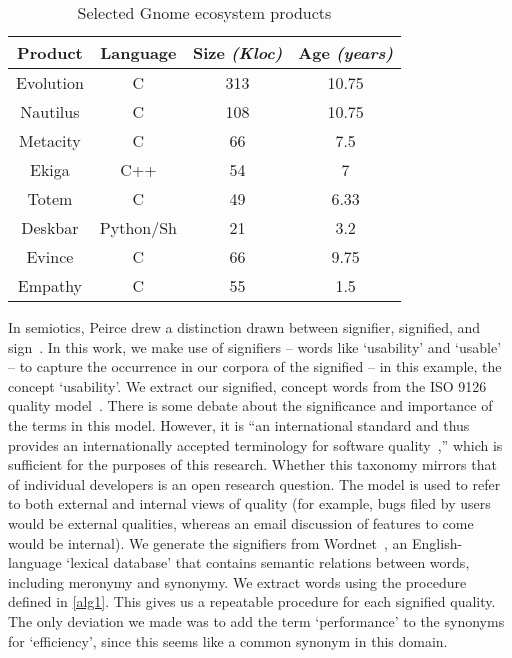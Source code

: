 \documentclass[conference, compsoc]{IEEEtran}
\begin{document}
\begin{table}
	\caption{Selected Gnome ecosystem products}
	\centering
	\label{tbl:projects}
\begin{tabular}{|c|c|c|c|}
\hline
\rowcolor[gray]{.9} 
\textbf{Product} & \textbf{Language} & \textbf{Size} \emph{(Kloc)} & \textbf{Age} \emph{(years)} \\
\hline
\hline 
Evolution & C & 313 & 10.75\\ \hline
Nautilus & C & 108 & 10.75  \\ \hline
Metacity & C & 66 & 7.5  \\ \hline
Ekiga & C++ & 54 & 7  \\ \hline
Totem & C & 49 & 6.33  \\ \hline
Deskbar & Python/Sh & 21 & 3.2  \\ \hline
Evince & C & 66 & 9.75\\ \hline
Empathy &C & 55 & 1.5\\ 
\hline
\end{tabular}
\end{table}

In semiotics, Peirce drew a distinction drawn between signifier, signified, and sign~\cite{atkin2006}. In this work, we make use of signifiers -- words like `usability' and `usable' -- to capture the occurrence in our corpora of the signified -- in this example, the concept `usability'. We extract our signified, concept words from the ISO 9126 quality model~\cite{iso9126}. There is some debate about the significance and importance of the terms in this model. However, it is ``an international standard and thus provides an internationally accepted terminology for software quality~\cite[p. 58]{Boegh2008},'' which is sufficient for the purposes of this research. Whether this taxonomy mirrors that of individual developers is an open research question. The model is used to refer to both external and internal views of quality (for example, bugs filed by users would be external qualities, whereas an email discussion of features to come would be internal). We generate the signifiers from Wordnet~\cite{Fellbaum1998}, an English-language `lexical database' that contains semantic relations between words, including meronymy and synonymy. We extract words using the procedure defined in \ref{alg1}. This gives us a repeatable procedure for each signified quality. The only deviation we made was to add the term `performance' to the synonyms for `efficiency', since this seems like a common synonym in this domain.%
\end{document}
